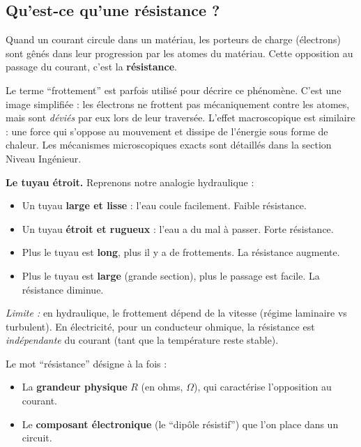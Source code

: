 \documentclass[12pt,a4paper,twoside]{book}
\begin{document}
\subsection{Qu'est-ce qu'une résistance ?}

Quand un courant circule dans un matériau, les porteurs de charge (électrons) sont gênés dans leur progression par les atomes du matériau. Cette opposition au passage du courant, c'est la \textbf{résistance}.

\begin{attention}
Le terme ``frottement'' est parfois utilisé pour décrire ce phénomène. C'est une image simplifiée : les électrons ne frottent pas mécaniquement contre les atomes, mais sont \textit{déviés} par eux lors de leur traversée. L'effet macroscopique est similaire : une force qui s'oppose au mouvement et dissipe de l'énergie sous forme de chaleur. Les mécanismes microscopiques exacts sont détaillés dans la section Niveau Ingénieur.
\end{attention}

\begin{analogie}
\textbf{Le tuyau étroit.} Reprenons notre analogie hydraulique :
\begin{itemize}[nosep]
\item Un tuyau \textbf{large et lisse} : l'eau coule facilement. Faible résistance.
\item Un tuyau \textbf{étroit et rugueux} : l'eau a du mal à passer. Forte résistance.
\item Plus le tuyau est \textbf{long}, plus il y a de frottements. La résistance augmente.
\item Plus le tuyau est \textbf{large} (grande section), plus le passage est facile. La résistance diminue.
\end{itemize}
\textit{Limite :} en hydraulique, le frottement dépend de la vitesse (régime laminaire vs turbulent). En électricité, pour un conducteur ohmique, la résistance est \textit{indépendante} du courant (tant que la température reste stable).
\end{analogie}

Le mot ``résistance'' désigne à la fois :
\begin{itemize}[nosep]
\item La \textbf{grandeur physique} $R$ (en ohms, $\Omega$), qui caractérise l'opposition au courant.
\item Le \textbf{composant électronique} (le ``dipôle résistif'') que l'on place dans un circuit.
\end{itemize}
\end{document}
